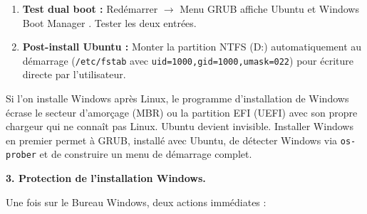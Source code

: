\documentclass[11pt]{article}
\newcommand{\cle}[1]{{\popxbold\color{popdark}#1}}
\begin{document}
\begin{exoresolu}
\begin{methode}
\begin{enumerate}
        \begin{itemize}
          \item Démarrer sur la clé Ubuntu. Choisir \og Installer Ubuntu \fg $\rightarrow$ \og Autre chose \fg (partitionnement manuel).
          \item Sur l'espace \og libre \fg (ou sur la partition étendue si D: a pris la 3ème primaire) : 
                \begin{itemize}
                  \item Créer partition \textbf{120 Go}, \textbf{ext4}, point de montage \texttt{/} (racine).
                  \item Créer partition \textbf{8 Go}, \textbf{swap} (zone d'échange).
                \end{itemize}
          \item \textbf{Chargeur d'amorçage (GRUB) :} S'assurer que \texttt{/dev/sda} (le disque entier) est sélectionné pour l'installation du programme de démarrage.
        \end{itemize}
  \item \textbf{Test dual boot :} Redémarrer $\rightarrow$ Menu GRUB affiche \og Ubuntu \fg et \og Windows Boot Manager \fg. Tester les deux entrées.
  \item \textbf{Post-install Ubuntu :} Monter la partition NTFS (D:) automatiquement au démarrage (\texttt{/etc/fstab} avec \texttt{uid=1000,gid=1000,umask=022}) pour écriture directe par l'utilisateur.
\end{enumerate}
\end{methode}

\begin{attention}
Si l'on installe Windows après Linux, le programme d'installation de Windows écrase le secteur d'amorçage (MBR) ou la partition EFI (UEFI) avec son propre chargeur qui ne connaît pas Linux. Ubuntu devient invisible. Installer Windows en premier permet à \cle{GRUB}, installé avec Ubuntu, de détecter Windows via \texttt{os-prober} et de construire un menu de démarrage complet.
\end{attention}

\textbf{3. Protection de l'installation Windows.}

Une fois sur le Bureau Windows, deux actions immédiates :


\end{exoresolu}
\end{document}

